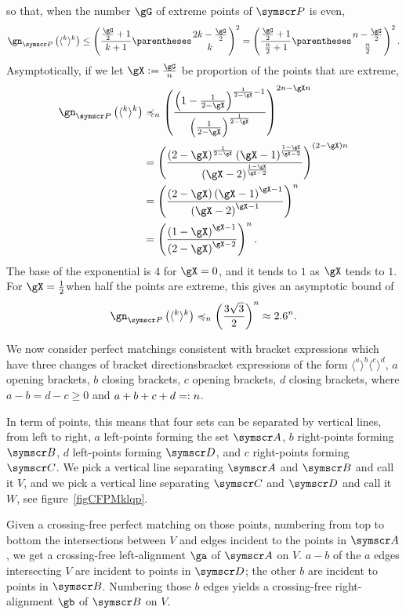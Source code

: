 so that, when the number $\gG$ of extreme points of $\pointset P$ is even,\[
\gn_{\pointset P}\of{\langle^k\rangle^k}\leq
\pa{\frac{\frac \gG 2+1}{k+1}\binom{2k-\frac \gG 2}{k}}^2=
\pa{\frac{\frac \gG 2+1}{\frac n 2+1}\binom{n-\frac \gG 2}{\frac n 2}}^2\text.
\]
Asymptotically, if we let $\gX\DefineAs\frac{\gG}{n}$ be proportion of the points that are extreme,
\begin{align*}
\gn_{\pointset P}\of{\langle^k\rangle^k}
&\preccurlyeq_n
\pa{
  \frac
    {\pa{1-\frac{1}{2-\gX}}^{\frac{1}{2-\gX}-1}}
    {\pa{\frac{1}{2-\gX}}^{\frac{1}{2-\gX}}}
}^{2n-\gX n}\\
&=
\pa{
  \frac
    {\pa{2-\gX}^{\frac{1}{2-\gX}} \pa{\gX-1}^{\frac{1-\gX}{\gX-2}}}
    {\pa{\gX-2}^{\frac{1-\gX}{\gX-2}}}
}^{\pa{2-\gX}n}\\
&=
\pa{
  \frac
    {\pa{2-\gX} \pa{\gX-1}^{\gX-1}}
    {\pa{\gX-2}^{\gX-1}}
}^{n} \\
&=
\pa{
  \frac
    {\pa{1-\gX}^{\gX-1}}
    {\pa{2-\gX}^{\gX-2}}
}^{n}
\text.
\end{align*}
The base of the exponential is $4$ for $\gX=0$, and it tends to $1$ as $\gX$ tends to $1$.
For $\gX=\frac 1 2$\idest when half the points are extreme, this gives an asymptotic bound of
\[
\gn_{\pointset P}\of{\langle^k\rangle^k}
\preccurlyeq_n
\pa{\frac{3\sqrt{3}}{2}}^n\approx 2.6^n\text.\]

\label{sectionThreeChanges}
We now consider perfect matchings consistent with bracket expressions which have three
changes of bracket directions\idest bracket expressions of the form
$\langle^a\rangle^b\langle^c\rangle^d$,
$a$ opening brackets, $b$ closing brackets, $c$ opening brackets, $d$ closing brackets, where
$a-b=d-c\geq 0$ and $a+b+c+d=: n$.

In term of points, this means that four sets can be separated by vertical lines, from left
to right, $a$ left-points forming the set $\pointset A$, $b$ right-points forming $\pointset B$,
$d$ left-points
forming $\pointset D$, and $c$ right-points forming $\pointset C$.
We pick a vertical line separating $\pointset A$ and $\pointset B$ and call it $V$, and we pick
a vertical line separating $\pointset C$ and $\pointset D$ and call it $W$,
see figure~\ref{figCFPMklqp}.

Given a crossing-free perfect matching on those points, numbering from top to bottom the
intersections between $V$ and edges incident to the points in $\pointset A$,
we get a crossing-free left-alignment $\ga$ of $\pointset A$ on $V$. $a-b$ of the $a$ edges
intersecting $V$
are incident to points in $\pointset D$; the other $b$ are incident to points in $\pointset B$.
Numbering those $b$ edges yields a crossing-free right-alignment $\gb$ of $\pointset B$ on $V$.

